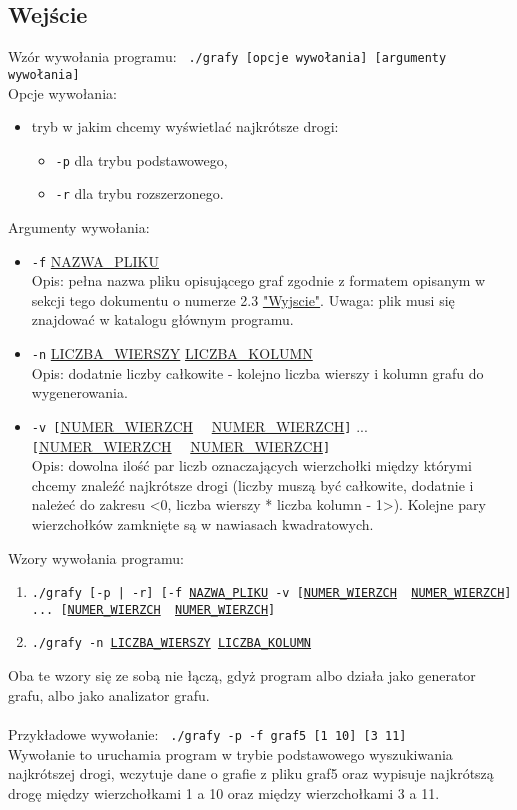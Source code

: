 \documentclass{article}
\begin{document}
\subsection{Wejście}
Wzór wywołania programu:
\texttt{ ./grafy [opcje wywołania] [argumenty wywołania] }
\\Opcje wywołania:
\begin{itemize}
\item tryb w jakim chcemy wyświetlać najkrótsze drogi:
\begin{itemize}
    \item \texttt{-p} dla trybu podstawowego,
    \item \texttt{-r} dla trybu rozszerzonego.
\end{itemize}
\end{itemize}
Argumenty wywołania:
\begin{itemize}
\item \texttt{-f} \underline{NAZWA\_PLIKU}
\\Opis: pełna nazwa pliku opisującego graf zgodnie z formatem opisanym w sekcji tego dokumentu o numerze 2.3 \hyperref[sec:Wyjscie]{"Wyjscie"}. Uwaga: plik musi się znajdować w katalogu głównym programu.
\item \texttt{-n} \underline{LICZBA\_WIERSZY} \underline{LICZBA\_KOLUMN}
\\Opis: dodatnie liczby całkowite - kolejno liczba wierszy i kolumn grafu do wygenerowania. 
\item \texttt{-v [}\underline{NUMER\_WIERZCH} \ \ \underline{NUMER\_WIERZCH}\texttt{]} ... \texttt{[}\underline{NUMER\_WIERZCH} \ \ \underline{NUMER\_WIERZCH}\texttt{]}
\\Opis: dowolna ilość par liczb oznaczających wierzchołki między którymi chcemy znaleźć najkrótsze drogi (liczby muszą być całkowite, dodatnie i należeć do zakresu <0, liczba wierszy * liczba kolumn - 1>). Kolejne pary wierzchołków zamknięte są w nawiasach kwadratowych.

\end{itemize}
Wzory wywołania programu:
\begin{enumerate}
\item \texttt{./grafy [-p | -r] [-f \underline{NAZWA\_PLIKU} -v [\underline{NUMER\_WIERZCH} \ \underline{NUMER\_WIERZCH}] ... [\underline{NUMER\_WIERZCH} \ \underline{NUMER\_WIERZCH}]}
\item \texttt{./grafy -n \underline{LICZBA\_WIERSZY} \underline{LICZBA\_KOLUMN}}
\end{enumerate}
Oba te wzory się ze sobą nie łączą, gdyż program albo działa jako generator grafu, albo jako analizator grafu.
\\ \\Przykładowe wywołanie: \texttt{ ./grafy -p -f graf5 [1 10] [3 11] }
\\Wywołanie to uruchamia program w trybie podstawowego wyszukiwania najkrótszej drogi, wczytuje dane o grafie z pliku graf5 oraz wypisuje najkrótszą drogę między wierzchołkami 1 a 10 oraz między wierzchołkami 3 a 11.
\end{document}
